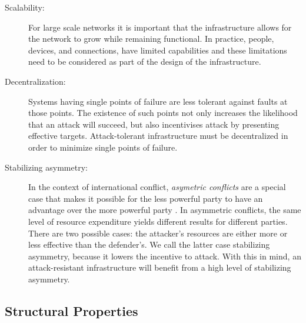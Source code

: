 \documentclass{sig-alternate-05-2015}
\begin{document}
\begin{description}
\item[Scalability:]
For large scale networks it is important that the infrastructure allows
for the network to grow while remaining functional.
In practice, people, devices, and connections, have limited capabilities
and these limitations need to be considered as part of the design of the
infrastructure. 

\item [Decentralization:]
Systems having single points of failure are less tolerant against faults at
those points.
The existence of such points not only increases the likelihood that an attack
will succeed,
but also incentivises attack by presenting effective targets.
Attack-tolerant infrastructure must be decentralized in order to
minimize single points of failure.

\item[Stabilizing asymmetry:]
In the context of international conflict,
{\em asymetric conflicts} are a special case that makes it possible for the
less powerful party to have an advantage over the more powerful party
\cite{mack_why_1975}.
In asymmetric conflicts, the same level of resource expenditure yields different
results for different parties.
There are two possible cases:
the attacker's resources are either more or less effective than the defender's.
We call the latter case stabilizing asymmetry,
because it lowers the incentive to attack.
With this in mind, an attack-resistant infrastructure will benefit from a high
level of stabilizing asymmetry.

\end{description}
\subsection{Structural Properties}
\end{document}
